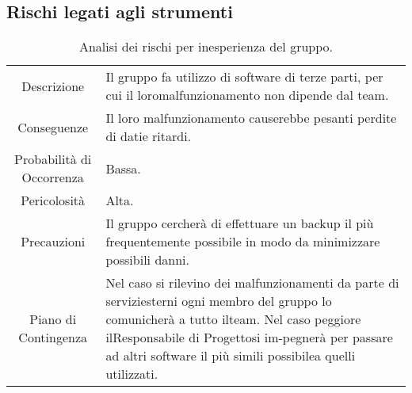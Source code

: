 \subsection{Rischi legati agli strumenti}

\begin{table}[H]
    \begin{tabular}{|c | p{10cm}|}
    \hline
    \rowcolor{darkblue}
    \multicolumn{2}{|c|}{\textbf{RS1 - Inesperienza del Gruppo}} \\
    \hline
    Descrizione & Il gruppo fa utilizzo di software di terze parti, per cui il loromalfunzionamento non dipende dal team.\\ 
    \hline
    Conseguenze & Il loro malfunzionamento causerebbe pesanti perdite di datie ritardi.\\
    \hline
    Probabilità di Occorrenza & Bassa.\\
    \hline
    Pericolosità & Alta.\\
    \hline
    Precauzioni & Il gruppo cercherà di effettuare un backup il più frequentemente possibile in modo da minimizzare possibili danni.\\ 
    \hline
    Piano di Contingenza & Nel caso si rilevino dei malfunzionamenti da parte di serviziesterni ogni membro del gruppo lo comunicherà a tutto ilteam. Nel caso peggiore ilResponsabile di Progettosi im-pegnerà per passare ad altri software il più simili possibilea quelli utilizzati.\\ 
    \hline
    \end{tabular}
    \caption{\label{tab:RS1}Analisi dei rischi per inesperienza del gruppo.}
    
\end{table}